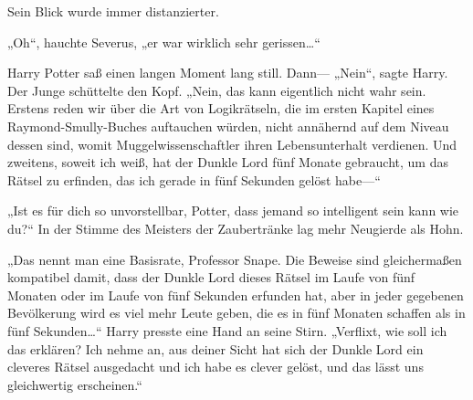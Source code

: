Sein Blick wurde immer distanzierter.

„Oh“, hauchte Severus, „er war wirklich sehr gerissen…“

Harry Potter saß einen langen Moment lang still. Dann— „Nein“, sagte Harry. Der Junge schüttelte den Kopf. „Nein, das kann eigentlich nicht wahr sein. Erstens reden wir über die Art von Logikrätseln, die im ersten Kapitel eines Raymond-Smully-Buches auftauchen würden, nicht annähernd auf dem Niveau dessen sind, womit Muggelwissenschaftler ihren Lebensunterhalt verdienen. Und zweitens, soweit ich weiß, hat der Dunkle Lord fünf Monate gebraucht, um das Rätsel zu erfinden, das ich gerade in fünf Sekunden gelöst habe—“

„Ist es für dich so unvorstellbar, Potter, dass jemand so intelligent sein kann wie du?“ In der Stimme des Meisters der Zaubertränke lag mehr Neugierde als Hohn.

„Das nennt man eine Basisrate, Professor Snape. Die Beweise sind gleichermaßen kompatibel damit, dass der Dunkle Lord dieses Rätsel im Laufe von fünf Monaten oder im Laufe von fünf Sekunden erfunden hat, aber in jeder gegebenen Bevölkerung wird es viel mehr Leute geben, die es in fünf Monaten schaffen als in fünf Sekunden…“ Harry presste eine Hand an seine Stirn. „Verflixt, wie soll ich das erklären? Ich nehme an, aus deiner Sicht hat sich der Dunkle Lord ein cleveres Rätsel ausgedacht und ich habe es clever gelöst, und das lässt uns gleichwertig erscheinen.“

